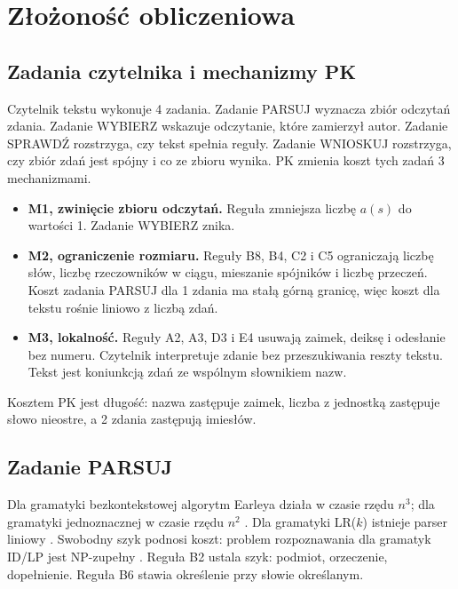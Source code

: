 
\section{Złożoność obliczeniowa}
\label{sec:complexity}

\subsection{Zadania czytelnika i mechanizmy PK}

Czytelnik tekstu wykonuje 4 zadania. Zadanie PARSUJ wyznacza zbiór odczytań zdania.
Zadanie WYBIERZ wskazuje odczytanie, które zamierzył autor. Zadanie SPRAWDŹ rozstrzyga,
czy tekst spełnia reguły. Zadanie WNIOSKUJ rozstrzyga, czy zbiór zdań jest spójny i co ze
zbioru wynika. PK zmienia koszt tych zadań 3 mechanizmami.
\begin{itemize}[leftmargin=1.6em]
  \item \textbf{M1, zwinięcie zbioru odczytań.} Reguła zmniejsza liczbę $a(s)$ do wartości 1. Zadanie
  WYBIERZ znika.
  \item \textbf{M2, ograniczenie rozmiaru.} Reguły B8, B4, C2 i C5 ograniczają liczbę słów,
  liczbę rzeczowników w ciągu, mieszanie spójników i liczbę przeczeń. Koszt zadania
  PARSUJ dla 1 zdania ma stałą górną granicę, więc koszt dla tekstu rośnie liniowo
  z liczbą zdań.
  \item \textbf{M3, lokalność.} Reguły A2, A3, D3 i E4 usuwają zaimek, deiksę i odesłanie
  bez numeru. Czytelnik interpretuje zdanie bez przeszukiwania reszty tekstu. Tekst jest
  koniunkcją zdań ze wspólnym słownikiem nazw.
\end{itemize}
Kosztem PK jest długość: nazwa zastępuje zaimek, liczba z jednostką zastępuje słowo
nieostre, a 2 zdania zastępują imiesłów.

\subsection{Zadanie PARSUJ}
\label{sec:parse}

Dla gramatyki bezkontekstowej algorytm Earleya działa w czasie rzędu $n^3$; dla gramatyki
jednoznacznej w czasie rzędu $n^2$ \cite{earley1970}. Dla gramatyki LR($k$) istnieje parser
liniowy \cite{knuth1965,leo1991}. Swobodny szyk podnosi koszt: problem rozpoznawania dla
gramatyk ID/LP jest NP-zupełny \cite{barton1985}. Reguła B2 ustala szyk: podmiot,
orzeczenie, dopełnienie. Reguła B6 stawia określenie przy słowie określanym.


